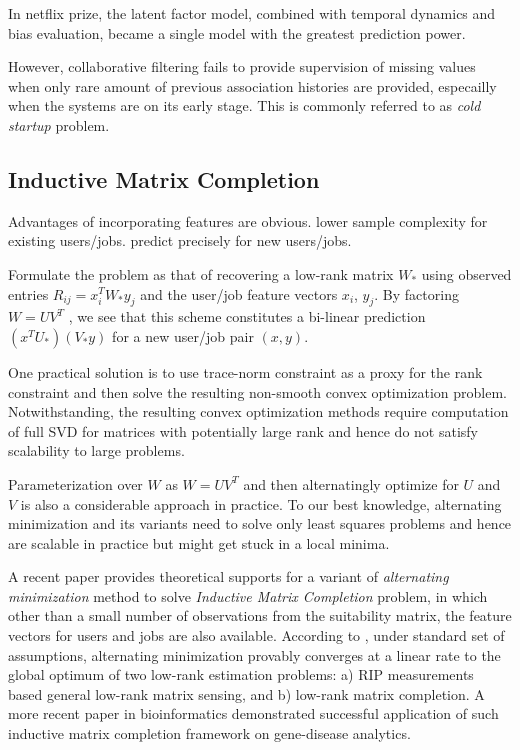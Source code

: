 \documentclass{article} %
\begin{document}
In netflix prize, the latent factor model, combined with temporal dynamics and
bias evaluation, became a single model with the greatest prediction power.

However, collaborative filtering fails to provide supervision of missing
values when only rare amount of previous association histories are provided,
especailly when the systems are on its early stage.
This is commonly referred to as {\it cold startup} problem.

\subsection{Inductive Matrix Completion}
Advantages of incorporating features are obvious. 
lower sample complexity for existing users/jobs.
predict precisely for new users/jobs. 

Formulate the problem as that of recovering a low-rank matrix $W_*$ using
observed entries $R_{ij} = x_i^T W_{*} y_j$ and the user/job feature vectors $x_i$, $y_j$. By
factoring $W = U V^T$ , we see that this scheme constitutes a bi-linear
prediction $(x^T U_{*})(V_{*} y)$ for a new user/job pair $(x, y)$.

One practical solution is to use trace-norm constraint as a proxy for the rank
constraint and then solve the resulting non-smooth convex optimization
problem. Notwithstanding, the resulting convex optimization methods require
computation of full SVD for matrices with potentially large rank and hence do
not satisfy scalability to large problems.

Parameterization over $W$ as $W = U V^T$ and then alternatingly optimize for
$U$ and $V$ is also a considerable approach in practice. To our best
knowledge, alternating minimization and its variants need to solve only least
squares problems and hence are scalable in practice but might get stuck in a
local minima.

A recent paper \cite{jain2013provable} provides theoretical
supports for a variant of {\it alternating minimization} method to solve
{\it Inductive Matrix Completion} problem, in which other than a small number
of observations from the suitability matrix, the feature vectors for users and
jobs are also available.
According to \cite{jain2013provable}, under standard set of assumptions,
alternating minimization provably converges at a linear rate to the global
optimum of two low-rank estimation problems: a) RIP measurements based general
low-rank matrix sensing, and b) low-rank matrix completion. A more recent
paper \cite{natarajan2014inductive} in bioinformatics demonstrated successful
application of such inductive matrix completion
framework on gene-disease analytics.
\end{document}
